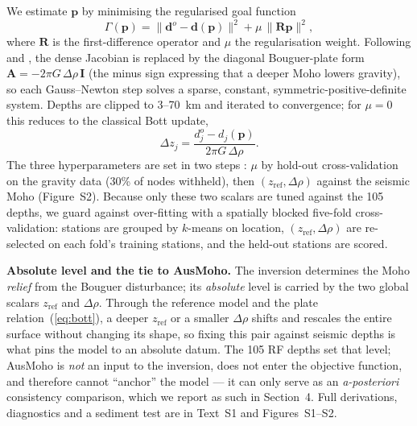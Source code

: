 \documentclass{agujournal2019}
\begin{document}
We estimate $\mathbf{p}$ by minimising the regularised goal function
\begin{equation}
\Gamma(\mathbf{p}) = \big\|\mathbf{d}^{o}-\mathbf{d}(\mathbf{p})\big\|^{2}
 + \mu\,\big\|\mathbf{R}\mathbf{p}\big\|^{2},
\label{eq:goal}
\end{equation}
where $\mathbf{R}$ is the first-difference operator and $\mu$ the regularisation
weight. Following  and , the dense Jacobian is
replaced by the diagonal Bouguer-plate form
$\mathbf{A}=-2\pi G\,\Delta\rho\,\mathbf{I}$ (the minus sign expressing that a
deeper Moho lowers gravity), so each Gauss--Newton step solves a sparse, constant,
symmetric-positive-definite system. Depths are clipped to 3--70~km and iterated to
convergence; for $\mu=0$ this reduces to the classical Bott update,
\begin{equation}
\Delta z_j = \frac{d^{o}_j - d_j(\mathbf{p})}{2\pi G\,\Delta\rho}.
\label{eq:bott}
\end{equation}
The three hyperparameters are set in two steps \cite{uieda2017}: $\mu$ by hold-out
cross-validation on the gravity data (30\% of nodes withheld), then
$(z_{\mathrm{ref}},\Delta\rho)$ against the seismic Moho (Figure~S2). Because only
these two scalars are tuned against the 105 depths, we guard against over-fitting
with a spatially blocked five-fold cross-validation: stations are grouped by
$k$-means on location, $(z_{\mathrm{ref}},\Delta\rho)$ are re-selected on each
fold's training stations, and the held-out stations are scored.

\textbf{Absolute level and the tie to AusMoho.} The inversion determines the Moho
\emph{relief} from the Bouguer disturbance; its \emph{absolute} level is carried by
the two global scalars $z_{\mathrm{ref}}$ and $\Delta\rho$. Through the reference
model and the plate relation~(\ref{eq:bott}), a deeper $z_{\mathrm{ref}}$ or a
smaller $\Delta\rho$ shifts and rescales the entire surface without changing its
shape, so fixing this pair against seismic depths is what pins the model to an
absolute datum. The 105 RF depths \cite{fauzi2021} set that level; AusMoho \cite{kennett2011} is
\emph{not} an input to the inversion, does not enter the objective function, and
therefore cannot ``anchor'' the model --- it can only serve as an
\emph{a-posteriori} consistency comparison, which we report as such in Section~4.
Full derivations, diagnostics and a sediment test are in Text~S1 and
Figures~S1--S2.
\end{document}
